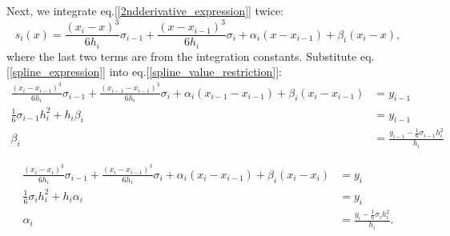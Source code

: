 \documentclass[paper=a4,fontsize=11pt]{scrartcl} %
\begin{document}
Next, we integrate eq.[\ref{2ndderivative_expression}] twice:
\begin{equation}\label{spline_expression}
s_i(x) = \frac{(x_i - x)^3}{6h_i}\sigma_{i-1} + \frac{(x - x_{i-1})^3}{6h_i}\sigma_{i} + \alpha_i(x-x_{i-1}) + \beta_i(x_i-x),
\end{equation}
where the last two terms are from the integration constants. Substitute eq.[\ref{spline_expression}] into eq.[\ref{spline_value_restriction}]:
\begin{equation}\label{beta}
\begin{split}
\frac{(x_i - x_{i-1})^3}{6h_i}\sigma_{i-1} + \frac{(x_{i-1} - x_{i-1})^3}{6h_i}\sigma_{i} + \alpha_i(x_{i-1}-x_{i-1}) + \beta_i(x_i-x_{i-1}) & = y_{i-1} \\
\frac{1}{6}\sigma_{i-1}h_i^2 + h_i\beta_i & = y_{i-1} \\
\beta_i & = \frac{y_{i-1}-\frac{1}{6}\sigma_{i-1}h_i^2}{h_i}
\end{split}
\end{equation}

\begin{equation}\label{alpha}
\begin{split}
\frac{(x_i - x_i)^3}{6h_i}\sigma_{i-1} + \frac{(x_i - x_{i-1})^3}{6h_i}\sigma_{i} + \alpha_i(x_i-x_{i-1}) + \beta_i(x_i-x_i) & = y_{i}\\
\frac{1}{6}\sigma_{i}h_i^2 + h_i\alpha_i & = y_{i}\\
\alpha_i & = \frac{y_{i}-\frac{1}{6}\sigma_{i}h_i^2}{h_i}.
\end{split}
\end{equation}
\end{document}
